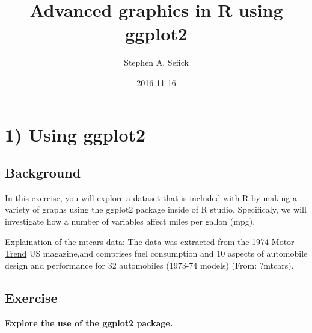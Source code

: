 \documentclass[11pt]{article}
\author{Stephen A. Sefick}
\date{2016-11-16}
\title{Advanced graphics in R using ggplot2}
\begin{document}
\maketitle
\tableofcontents


\section{1) Using ggplot2}
\label{sec:orgheadline3}

\subsection{Background}
\label{sec:orgheadline1}
In this exercise, you will explore a dataset that is included with R by making a variety of graphs using the ggplot2 package inside of R studio. Specificaly, we will investigate how a number of variables affect miles per gallon (mpg).

Explaination of the mtcars data:
The data was extracted from the 1974 \uline{Motor Trend} US magazine,and comprises fuel consumption and 10 aspects of automobile design and performance for 32 automobiles (1973-74 models) (From: ?mtcars).

\subsection{Exercise}
\label{sec:orgheadline2}
\textbf{Explore the use of the ggplot2 package.}
\end{document}
